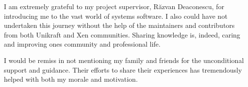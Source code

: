 \vspace*{7cm}
\begin{center}
I am extremely grateful to my project supervisor, Răzvan Deaconescu, for introducing me to the vast world of systems software.
I also could have not undertaken this journey without the help of the maintainers and contributors from both Unikraft and Xen communities.
Sharing knowledge is, indeed, caring and improving ones community and professional life.
\end{center}
\vspace{0.6cm}
\begin{center}
I would be remiss in not mentioning my family and friends for the unconditional support and guidance.
Their efforts to share their experiences has tremendously helped with both my morale and motivation.
\end{center}
